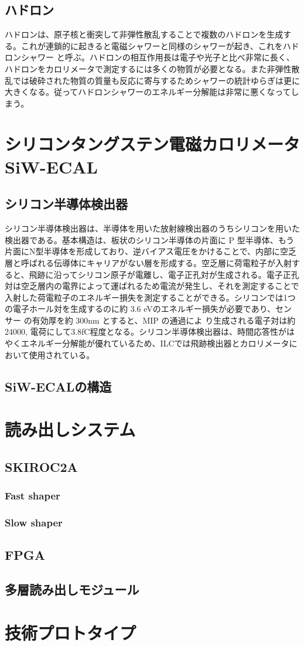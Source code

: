 \subsection{ハドロン}
ハドロンは、原子核と衝突して非弾性散乱することで複数のハドロンを生成する。これが連鎖的に起きると電磁シャワーと同様のシャワーが起き、これをハドロンシャワー と呼ぶ。ハドロンの相互作用長は電子や光子と比べ非常に長く、ハドロンをカロリメータで測定するには多くの物質が必要となる。また非弾性散乱では破砕された物質の質量も反応に寄与するためシャワーの統計ゆらぎは更に大きくなる。従ってハドロンシャワーのエネルギー分解能は非常に悪くなってしまう。
\section{シリコンタングステン電磁カロリメータ SiW-ECAL}
\subsection{シリコン半導体検出器}
シリコン半導体検出器は、半導体を用いた放射線検出器のうちシリコンを用いた検出器である。基本構造は、板状のシリコン半導体の片面に P 型半導体、もう片面にN型半導体を形成しており、逆バイアス電圧をかけることで、内部に空乏層と呼ばれる伝導体にキャリアがない層を形成する。空乏層に荷電粒子が入射すると、飛跡に沿ってシリコン原子が電離し、電子正孔対が生成される。電子正孔対は空乏層内の電界によって運ばれるため電流が発生し、それを測定することで入射した荷電粒子のエネルギー損失を測定することができる。シリコンでは1つの電子ホール対を生成するのに約 3.6 eVのエネルギー損失が必要であり、センサー の有効厚を約 300nm とすると、MIP の通過によ り生成される電子対は約 24000, 電荷にして3.8fC程度となる。シリコン半導体検出器は、時間応答性がはやくエネルギー分解能が優れているため、ILCでは飛跡検出器とカロリメータにおいて使用されている。
\subsection{SiW-ECALの構造}
\section{読み出しシステム}
\subsection{SKIROC2A}
\subsubsection{Fast shaper}
\subsubsection{Slow shaper}
\subsection{FPGA}
\subsection{多層読み出しモジュール}

\section{技術プロトタイプ}
